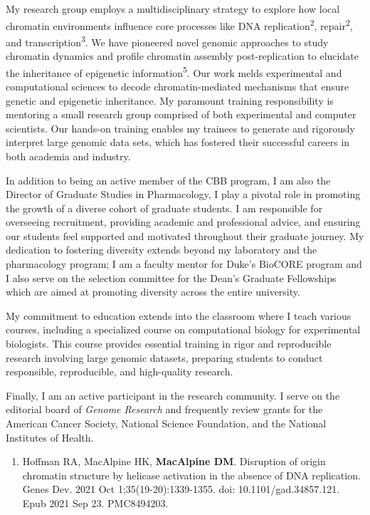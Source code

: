 \begin{statement}
My research group employs a multidisciplinary strategy to explore how local chromatin environments influence core processes like DNA replication\textsuperscript{2}, repair\textsuperscript{2}, and transcription\textsuperscript{3}. We have pioneered novel genomic approaches to study chromatin dynamics and profile chromatin assembly post-replication to elucidate the inheritance of epigenetic information\textsuperscript{5}. Our work melds experimental and computational sciences to decode chromatin-mediated mechanisms that ensure genetic and epigenetic inheritance. My paramount training responsibility is mentoring a small research group comprised of both experimental and computer scientists. Our hands-on training enables my trainees to generate and rigorously interpret large genomic data sets, which has fostered their successful careers in both academia and industry.

In addition to being an active member of the CBB program, I am also the  Director of Graduate Studies in Pharmacology, I play a pivotal role in promoting the growth of a diverse cohort of graduate students. I am responsible for overseeing recruitment, providing academic and professional advice, and ensuring our students feel supported and motivated throughout their graduate journey. My dedication to fostering diversity extends beyond my laboratory and the pharmacology program; I am a faculty mentor for Duke's  BioCORE program and I also serve on the selection committee for the Dean's Graduate Fellowships which are aimed at promoting diversity across the entire university.  

My commitment to education extends into the classroom where I teach various courses, including a specialized course on computational biology for experimental biologists. This course provides essential training in rigor and reproducible research involving large genomic datasets, preparing students to conduct responsible, reproducible, and high-quality research.

 Finally, I am an active participant in the research community. I serve on the editorial board of \textit{Genome Research} and frequently review grants for the American Cancer Society, National Science Foundation, and the National Institutes of Health.  

\begin{enumerate}

\item Hoffman RA, MacAlpine HK, \textbf{MacAlpine DM}. Disruption of origin chromatin structure by helicase activation in the absence of DNA replication. Genes Dev. 2021 Oct 1;35(19-20):1339-1355. doi: 10.1101/gad.34857.121. Epub 2021 Sep 23. PMC8494203.


\end{enumerate}
\end{statement}
